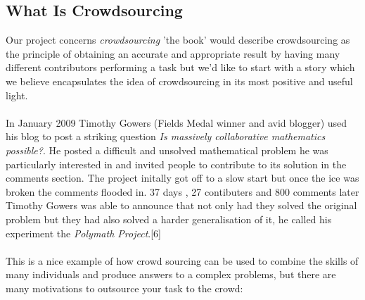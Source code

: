 \documentclass[11pt]{article}
\begin{document}
\subsection{What Is Crowdsourcing} %
Our project concerns \emph{crowdsourcing} 'the book' would describe crowdsourcing as the principle of obtaining an accurate 
and appropriate result by having many different contributors performing a task but we'd like to start with a story which
we believe encapsulates the idea of crowdsourcing in its most positive and useful light.
\\
\\
In January 2009 Timothy Gowers (Fields Medal winner and avid blogger) used his blog to post a striking question \emph{Is massively 
collaborative mathematics possible?}. He posted a difficult and unsolved mathematical problem he was particularly interested in and invited 
people to contribute to its solution in the comments section. The project initally got off to a slow start but once the ice was broken the 
comments flooded in. 37 days , 27 contibuters and 800 comments later Timothy Gowers was able to announce that not only had they solved the 
original problem but they had also solved a harder generalisation of it, he called his experiment the \emph{Polymath Project}.[6]
\\
\\
This is a nice example of how crowd sourcing can be used to combine the skills of many individuals and produce answers to a complex problems,
but there are many motivations to outsource your task to the crowd:
\end{document}
